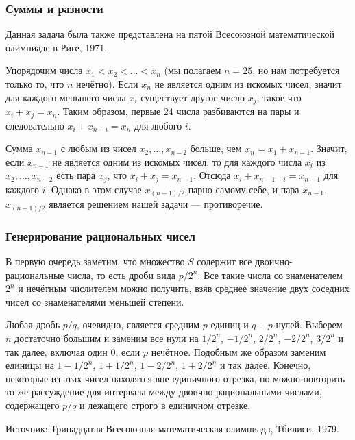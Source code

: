 \subsubsection*{Суммы и разности}%

Данная задача была также представлена на пятой Всесоюзной математической олимпиаде в Риге, 1971.

\medskip

Упорядочим числа $x_1<x_2<\dots<x_n$ (мы полагаем $n=25$, но нам потребуется только то, что $n$ нечётно).
Если $x_n$ не является одним из искомых чисел, значит для каждого меньшего числа $x_i$ существует другое число $x_j$, такое что $x_i+x_j=x_n$.
Таким образом, первые 24 числа разбиваются на пары и следовательно $x_i+x_{n-i}=x_n$ для любого $i$.

Сумма $x_{n-1}$ с любым из чисел $x_2,\dots,x_{n-2}$ больше, чем $x_n=x_1+x_{n-1}$.
Значит, если $x_{n-1}$ не является одним из искомых чисел, то для каждого числа $x_i$ из $x_2,\dots,x_{n-2}$ есть пара $x_j$, что 
$x_{i}+x_{j}=x_{n-1}$.
Отсюда $x_{i}+x_{n-1-i}=x_{n-1}$ для каждого $i$.
Однако в этом случае $x_{(n-1)/2}$ парно самому себе, 
и пара $x_{n-1}$, $x_{(n-1)/2}$ является решением нашей задачи --- противоречие.
\heart 

\subsubsection*{Генерирование рациональных чисел}%

В первую очередь заметим, что множество $S$ содержит все двоично-рациональные числа, 
то есть дроби вида $p/2^n$.
Все такие числа со знаменателем $2^n$ и нечётным числителем можно получить, взяв среднее значение двух соседних чисел со знаменателями меньшей степени.

Любая дробь $p/q$, очевидно, является средним $p$ единиц и $q-p$ нулей.
Выберем $n$ достаточно большим и заменим все нули на $1/2^n$, $-1/2^n$, $2/2^n$, $-2/2^n$, $3/2^n$ и так далее, включая один $0$, если $p$ нечётное.
Подобным же образом заменим единицы на $1-1/2^n$, $1+1/2^n$, $1-2/2^n$, $1+2/2^n$ и так далее.
Конечно, некоторые из этих чисел находятся вне единичного отрезка, но можно повторить то же рассуждение для интервала между двоично-рациональными числами, содержащего $p/q$ и лежащего строго в единичном отрезке.%
\heart

Источник: Тринадцатая Всесоюзная математическая олимпиада, Тбилиси, 1979.

